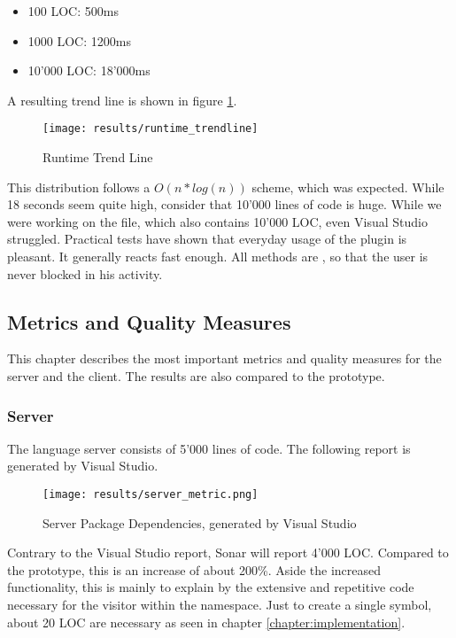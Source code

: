 \begin{itemize}
    \item 100 LOC: 500ms
    \item 1000 LOC: 1200ms
    \item 10'000 LOC: 18'000ms
\end{itemize}
A resulting trend line is shown in figure \ref{fig:trendline_1}.

\begin{figure}[H]
    \centering
    \texttt{[image: results/runtime\_trendline]}
    \caption{Runtime Trend Line}
    \label{fig:trendline_1}
\end{figure}

This distribution follows a $O(n*log(n))$ scheme, which was expected.
While 18 seconds seem quite high, consider that 10'000 lines of code is huge.
While we were working on the  file, which also contains 10'000 LOC, even Visual Studio struggled.
Practical tests have shown that everyday usage of the plugin is pleasant.
It generally reacts fast enough.
All methods are , so that the user is never blocked in his activity.

\subsection{Metrics and Quality Measures}
\label{section:results:metrics}
This chapter describes the most important metrics and quality measures for the server and the client.
The results are also compared to the prototype.

\subsubsection{Server}
The language server consists of 5'000 lines of code. The following report is generated by Visual Studio.
\begin{figure}[H]
    \centering
    \texttt{[image: results/server\_metric.png]}
    \caption{Server Package Dependencies, generated by Visual Studio}
    \label{fig:dependency_graph}
\end{figure}
Contrary to the Visual Studio report, Sonar will report 4'000 LOC.
Compared to the prototype, this is an increase of about 200\%.
Aside the increased functionality, this is mainly to explain by the extensive and repetitive code necessary for the visitor within the  namespace.
Just to create a single symbol, about 20 LOC are necessary as seen in chapter \ref{chapter:implementation}.\\

